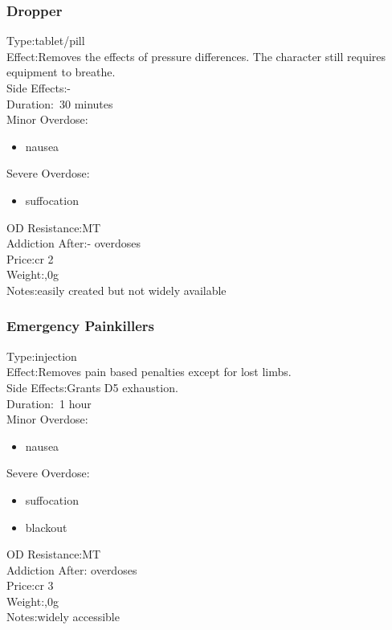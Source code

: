 \subsubsection{Dropper}
Type:\tab tablet/pill\\
Effect:\tab Removes the effects of pressure differences. The character still requires equipment to breathe.\\
Side Effects:\tab -\\
Duration:\tab ~30 minutes\\
Minor Overdose:\\
\begin{itemize}
	\setlength\itemsep{-8mm}
	\vspace{-12mm}
	\item nausea
\end{itemize}
Severe Overdose:\\
\begin{itemize}
	\setlength\itemsep{-8mm}
	\vspace{-12mm}
	\item suffocation
\end{itemize}
OD Resistance:\tab MT\\
Addiction After:\tab - overdoses\\
Price:\tab cr 2\\
Weight:,0g\\
Notes:\tab easily created but not widely available


\subsubsection{Emergency Painkillers}
Type:\tab injection\\
Effect:\tab Removes pain based penalties except for lost limbs.\\
Side Effects:\tab Grants D5 exhaustion.\\
Duration:\tab ~1 hour\\
Minor Overdose:\\
\begin{itemize}
	\setlength\itemsep{-8mm}
	\vspace{-12mm}
	\item nausea
\end{itemize}
Severe Overdose:\\
\begin{itemize}
	\setlength\itemsep{-8mm}
	\vspace{-12mm}
	\item suffocation
	\item blackout
\end{itemize}
OD Resistance:\tab MT\\
Addiction After: overdoses\\
Price:\tab cr 3\\
Weight:,0g\\
Notes:\tab widely accessible


